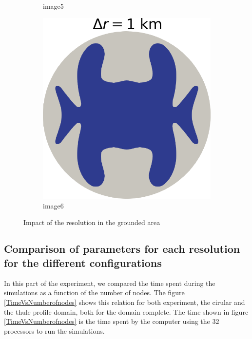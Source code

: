 \documentclass{article}
\begin{document}
\begin{figure}[!h]
\begin{subfigure}{0.25\textwidth}
		\caption{image5}
		\label{fig:5}
	\end{subfigure}\hfil %
	\begin{subfigure}{0.25\textwidth}
		\includegraphics[width=\linewidth]{../fig/Grounded_zone_1km.png}
		\caption{image6}
		\label{fig:6}
	\end{subfigure}
	\caption{Impact of the resolution in the grounded area}
	\label{Thule_resolutions}
\end{figure}


\subsection{Comparison of parameters for each resolution for the different configurations}
In this part of the experiment, we compared the time spent during the simulations as a function of the number of nodes. The figure \ref{TimeVsNumberofnodes} shows this relation for both experiment, the cirular and the thule profile domain, both for the domain complete. 
The time shown in figure \ref{TimeVsNumberofnodes} is the time spent by the computer using the 32 processors to run the simulations.
\end{document}

